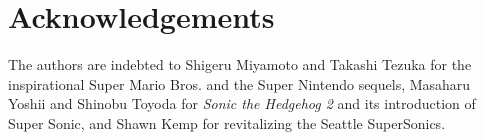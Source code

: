 \section*{Acknowledgements}

The authors are indebted to Shigeru Miyamoto and Takashi Tezuka for the inspirational Super Mario Bros.\cite{mario} and the Super Nintendo sequels, Masaharu Yoshii and Shinobu Toyoda for \textit{Sonic the Hedgehog 2}\cite{sonic2} and its introduction of Super Sonic, and Shawn Kemp for revitalizing the Seattle SuperSonics.

